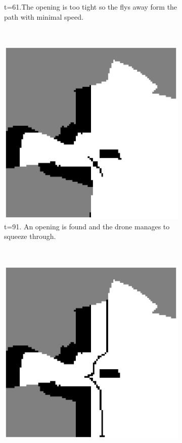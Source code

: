 \begin{figure}
\begin{subfigure}[t]{0.24\textwidth}
\caption{t=61.The opening is too tight so the flys away form the path with minimal speed.}
\label{fig:squeeze61}
\end{subfigure}
\,
\begin{subfigure}[t]{0.24\textwidth}
\includegraphics[width=\textwidth]{Figures/squeeze/t98_squeeze_through.eps}
\caption{t=91. An opening is found and the drone manages to squeeze through. }
\label{fig:squeeze98}
\end{subfigure}
\,
\begin{subfigure}[t]{0.24\textwidth}
\includegraphics[width=\textwidth]{Figures/squeeze/final_path.eps}

\end{subfigure}
\end{figure}
